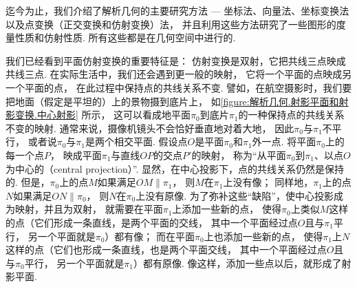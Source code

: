 迄今为止，我们介绍了解析几何的主要研究方法
--- 坐标法、向量法、坐标变换法以及点变换（正交变换和仿射变换）法，
并且利用这些方法研究了一些图形的度量性质和仿射性质.
所有这些都是在几何空间中进行的.

我们已经看到平面仿射变换的重要特征是：
仿射变换是双射，它把共线三点映成共线三点.
在实际生活中，我们还会遇到更一般的映射，
它将一个平面的点映成另一个平面的点，
在此过程中保持点的共线关系不变.
譬如，在航空摄影时，我们要把地面（假定是平坦的）上的景物摄到底片上，
如\cref{figure:解析几何.射影平面和射影变换.中心射影} 所示，
这可以看成地平面\(\pi_0\)到底片\(\pi_1\)的一种保持点的共线关系不变的映射.
通常来说，摄像机镜头不会恰好垂直地对着大地，
因此\(\pi_0\)与\(\pi_1\)不平行，
或者说\(\pi_0\)与\(\pi_1\)是两个相交平面.
假设点\(O\)是平面\(\pi_0\)和\(\pi_1\)外一点.
将平面\(\pi_0\)上的每一个点\(P\)，
映成平面\(\pi_1\)与直线\(OP\)的交点\(P'\)的映射，
称为“从平面\(\pi_0\)到\(\pi_1\)、以点\(O\)为中心的（central projection）”.
显然，在中心投影下，点的共线关系仍然是保持的.
但是，\(\pi_0\)上的点\(M\)如果满足\(OM \parallel \pi_1\)，
则\(M\)在\(\pi_1\)上没有像；
同样地，\(\pi_1\)上的点\(N\)如果满足\(ON \parallel \pi_0\)，
则\(N\)在\(\pi_0\)上没有原像.
为了弥补这些“缺陷”，使中心投影成为映射，并且为双射，
就需要在平面\(\pi_1\)上添加一些新的点，
使得\(\pi_0\)上类似\(M\)这样的点（它们形成一条直线，是两个平面的交线，
其中一个平面经过点\(O\)且与\(\pi_1\)平行，
另一个平面就是\(\pi_0\)）都有像；
而在平面\(\pi_0\)上也添加一些新的点，
使得\(\pi_1\)上\(N\)这样的点（它们也形成一条直线，也是两个平面交线，
其中一个平面经过点\(O\)且与\(\pi_0\)平行，
另一个平面就是\(\pi_1\)）都有原像.
像这样，添加一些点以后，就形成了射影平面.

